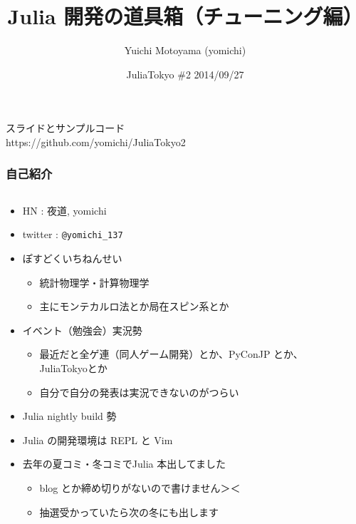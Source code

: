 \documentclass[dvipdfmx]{beamer}
\title{Julia 開発の道具箱（チューニング編）}
\author{Yuichi Motoyama (yomichi)}
\institute{Institute for Solid State Physics, Univ. of Tokyo}
\date{JuliaTokyo \#2 2014/09/27}
\begin{document}
\begin{frame}
  \titlepage
  スライドとサンプルコード \\ 
  https://github.com/yomichi/JuliaTokyo2
\end{frame}

\begin{frame}[containsverbatim]
  \frametitle{自己紹介}
  \begin{columns}
    \begin{column}{.8\linewidth}
  \begin{itemize}
    \item HN : 夜道, yomichi
    \item twitter : \verb|@yomichi_137|
    \item ぽすどくいちねんせい
      \begin{itemize}
        \item 統計物理学・計算物理学
        \item 主にモンテカルロ法とか局在スピン系とか
      \end{itemize}
    \item イベント（勉強会）実況勢
      \begin{itemize}
        \item 最近だと全ゲ連（同人ゲーム開発）とか、PyConJP とか、JuliaTokyoとか
        \item 自分で自分の発表は実況できないのがつらい
      \end{itemize}
    \item Julia nightly build 勢
    \item Julia の開発環境は REPL と Vim
    \item 去年の夏コミ・冬コミでJulia 本出してました
      \begin{itemize}
        \item blog とか締め切りがないので書けません＞＜
        \item 抽選受かっていたら次の冬にも出します
      \end{itemize}
  \end{itemize}
\end{column}
\begin{column}{.3\linewidth}

\end{column}
\end{columns}
\end{frame}
\end{document}
